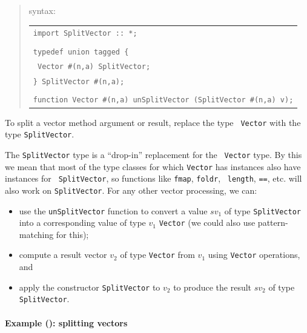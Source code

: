 \begin{quote}
  {\BSVb} syntax:
  \hspace*{1em}\begin{tabular}[t]{l}
    {\tt import SplitVector :: *;} \\
    \\
    {\tt typedef union tagged \{} \\
    {\tt \hspace*{2em}  Vector \#(n,a) SplitVector;} \\
    {\tt \} SplitVector \#(n,a);} \\
    \\
    {\tt function Vector \#(n,a) unSplitVector (SplitVector \#(n,a) v);}
  \end{tabular}
\end{quote}

To split a vector method argument or result, replace the type {\tt
  Vector} with the type {\tt SplitVector}.

The {\tt SplitVector} type is a ``drop-in'' replacement for the {\tt
  Vector} type.  By this we mean that most of the type classes for
which {\tt Vector} has instances also have instances for {\tt
  SplitVector}, so functions like {\tt fmap}, {\tt foldr}, {\tt
  length}, {\tt ==}, etc. will also work on {\tt SplitVector}.  For
any other vector processing, we can:

\begin{itemize}

  \item use the {\tt unSplitVector} function to convert a value $sv_1$
    of type {\tt SplitVector} into a corresponding value of type $v_1$
    {\tt Vector} (we could also use pattern-matching for this);

  \item compute a result vector $v_2$ of type {\tt Vector} from $v_1$
    using {\tt Vector} operations, and

  \item apply the constructor {\tt SplitVector} to $v_2$ to produce
    the result $sv_2$ of type {\tt SplitVector}.

\end{itemize}


\paragraph{Example (\BH): splitting vectors}


